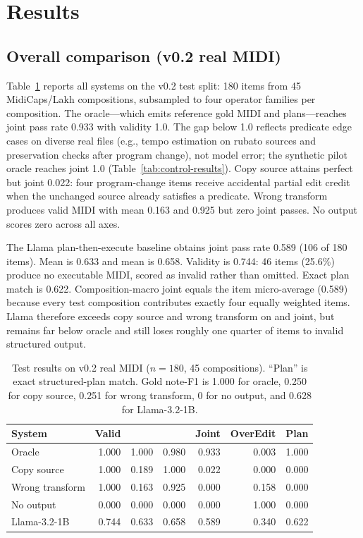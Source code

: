 \section{Results}

\subsection{Overall comparison (v0.2 real MIDI)}

Table~\ref{tab:overall-results} reports all systems on the v0.2 test split: 180 items from 45 MidiCaps/Lakh compositions, subsampled to four operator families per composition. The oracle---which emits reference gold MIDI and plans---reaches joint pass rate 0.933 with validity 1.0. The gap below 1.0 reflects predicate edge cases on diverse real files (e.g., tempo estimation on rubato sources and preservation checks after program change), not model error; the synthetic pilot oracle reaches joint 1.0 (Table~\ref{tab:control-results}). Copy source attains perfect \preserve{} but joint 0.022: four program-change items receive accidental partial edit credit when the unchanged source already satisfies a predicate. Wrong transform produces valid MIDI with mean \edit{} 0.163 and \preserve{} 0.925 but zero joint passes. No output scores zero across all axes.

The Llama plan-then-execute baseline obtains joint pass rate 0.589 (106 of 180 items). Mean \edit{} is 0.633 and mean \preserve{} is 0.658. Validity is 0.744: 46 items (25.6\%) produce no executable MIDI, scored as invalid rather than omitted. Exact plan match is 0.622. Composition-macro joint equals the item micro-average (0.589) because every test composition contributes exactly four equally weighted items. Llama therefore exceeds copy source and wrong transform on \edit{} and joint, but remains far below oracle and still loses roughly one quarter of items to invalid structured output.

\begin{table}[t]
\centering
\small
\setlength{\tabcolsep}{3.5pt}
\begin{tabular}{lrrrrrr}
\toprule
System & Valid & \edit{} & \preserve{} & Joint & OverEdit & Plan \\
\midrule
Oracle & 1.000 & 1.000 & 0.980 & 0.933 & 0.003 & 1.000 \\
Copy source & 1.000 & 0.189 & 1.000 & 0.022 & 0.000 & 0.000 \\
Wrong transform & 1.000 & 0.163 & 0.925 & 0.000 & 0.158 & 0.000 \\
No output & 0.000 & 0.000 & 0.000 & 0.000 & 1.000 & 0.000 \\
\midrule
Llama-3.2-1B & 0.744 & 0.633 & 0.658 & 0.589 & 0.340 & 0.622 \\
\bottomrule
\end{tabular}
\caption{Test results on v0.2 real MIDI ($n{=}180$, 45 compositions). ``Plan'' is exact structured-plan match. Gold note-F1 is 1.000 for oracle, 0.250 for copy source, 0.251 for wrong transform, 0 for no output, and 0.628 for Llama-3.2-1B.}
\label{tab:overall-results}
\end{table}

